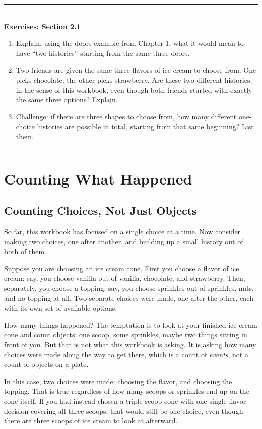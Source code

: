\documentclass[11pt]{book}
\newenvironment{exercisebox}[1]{%
\vspace{0.8em}\noindent\rule{\linewidth}{0.6pt}\\[0.2em]\textbf{Exercises: #1}\\[0.3em]%
\begin{enumerate}[label=\arabic*., itemsep=0.4em]}%
{\end{enumerate}\noindent\rule{\linewidth}{0.6pt}\vspace{0.6em}}
\begin{document}
\begin{exercisebox}{Section 2.1}
\item Explain, using the doors example from Chapter 1, what it would mean to have ``two histories'' starting from the same three doors.
\item Two friends are given the same three flavors of ice cream to choose from. One picks chocolate; the other picks strawberry. Are these two different histories, in the sense of this workbook, even though both friends started with exactly the same three options? Explain.
\item Challenge: if there are three shapes to choose from, how many different one-choice histories are possible in total, starting from that same beginning? List them.
\end{exercisebox}

\chapter{Counting What Happened}

\section{Counting Choices, Not Just Objects}

So far, this workbook has focused on a single choice at a time. Now consider making two choices, one after another, and building up a small history out of both of them.

Suppose you are choosing an ice cream cone. First you choose a flavor of ice cream: say, you choose vanilla out of vanilla, chocolate, and strawberry. Then, separately, you choose a topping: say, you choose sprinkles out of sprinkles, nuts, and no topping at all. Two separate choices were made, one after the other, each with its own set of available options.

How many things happened? The temptation is to look at your finished ice cream cone and count objects: one scoop, some sprinkles, maybe two things sitting in front of you. But that is not what this workbook is asking. It is asking how many choices were made along the way to get there, which is a count of \emph{events}, not a count of objects on a plate.

In this case, two choices were made: choosing the flavor, and choosing the topping. That is true regardless of how many scoops or sprinkles end up on the cone itself. If you had instead chosen a triple-scoop cone with one single flavor decision covering all three scoops, that would still be one choice, even though there are three scoops of ice cream to look at afterward.
\end{document}
